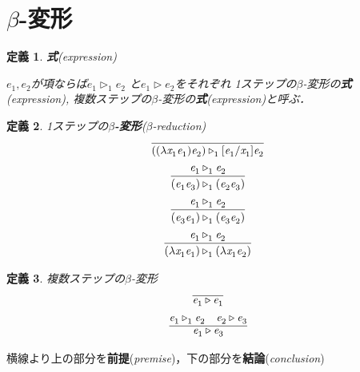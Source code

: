 \documentclass{ltjsbook}%
\newtheorem{definition}{定義}[section]%
\newcommand\term[2]{\textbf{#1}{(\textit{#2})}}%
\begin{document}
\section{$\beta$-変形}%
\label{sect:beta}%
\begin{definition}%
  \term{式}{expression}%
  \par$\mathit{e}_1^{},\mathit{e}_2^{}$が項ならば$\mathit{e}_1^{}\triangleright_1^{}\mathit{e}_2^{}$%
  と$\mathit{e}_1^{}\triangleright\mathit{e}_2^{}$をそれぞれ%
  1ステップの$\beta$-変形の\term{式}{expression},%
  複数ステップの$\beta$-変形の\term{式}{expression}と呼ぶ．%
\end{definition}%
\begin{definition}%
1ステップの\term{$\beta$-変形}{$\beta$-reduction}%
\begin{equation}%
  \infer{%
    ((\lambda\mathit{x}_1^{}\mathit{e}_1^{})\mathit{e}_2^{})\triangleright_1^{}%
    [\mathit{e}_1^{}/\mathit{x}_1^{}]\mathit{e}_2^{}%
  }{%
  }%
\end{equation}%
\begin{equation}%
  \infer{%
    (\mathit{e}_1^{}\mathit{e}_3^{})\triangleright_1^{}(\mathit{e}_2^{}\mathit{e}_3^{})%
  }{%
    \mathit{e}_1^{}\triangleright_1^{}\mathit{e}_2^{}%
  }%
\end{equation}%
\begin{equation}%
  \infer{%
    (\mathit{e}_3^{}\mathit{e}_1^{})\triangleright_1^{}(\mathit{e}_3^{}\mathit{e}_2^{})%
  }{%
    \mathit{e}_1^{}\triangleright_1^{}\mathit{e}_2^{}%
  }%
\end{equation}%
\begin{equation}%
  \infer{%
    (\lambda\mathit{x}_1^{}\mathit{e}_1^{})\triangleright_1^{}%
    (\lambda\mathit{x}_1^{}\mathit{e}_2^{})%
  }{%
    \mathit{e}_1^{}\triangleright_1^{}\mathit{e}_2^{}%
  }%
\end{equation}%
\end{definition}%
\begin{definition}%
複数ステップの$\beta$-変形%
\begin{equation}%
  \infer{%
    \mathit{e}_1^{}\triangleright\mathit{e}_1^{}%
  }{%
  }%
\end{equation}%
\begin{equation}%
  \infer{%
    \mathit{e}_1^{}\triangleright\mathit{e}_3^{}%
  }{%
    \mathit{e}_1^{}\triangleright_1^{}\mathit{e}_2^{}%
  &%
    \mathit{e}_2^{}\triangleright\mathit{e}_3^{}%
  }%
\end{equation}%
\end{definition}%
\par 横線より上の部分を\term{前提}{premise}，下の部分を\term{結論}{conclusion}%
\end{document}
